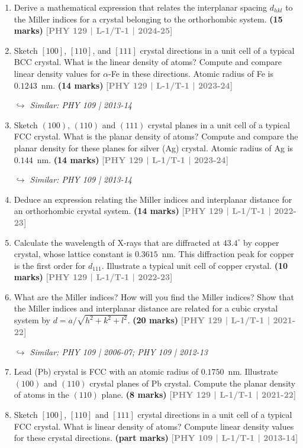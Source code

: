 \documentclass[12pt,a3paper]{article}
\newcommand{\yr}[1]{\hfill\textcolor{gray}{\small\textbf{[#1]}}}
\newcommand{\mk}[1]{\textcolor{orange!70!black}{\small\textbf{(#1 marks)}}}
\newcommand{\variant}[1]{\par\vspace{1pt}\textcolor{blue!50!black}%
  {\footnotesize\textit{$\hookrightarrow$ Similar: #1}}}
\begin{document}
\begin{enumerate}
\item Derive a mathematical expression that relates the interplanar spacing $d_{hkl}$ to the
Miller indices for a crystal belonging to the orthorhombic system.
\mk{15} \yr{PHY 129 | L-1/T-1 | 2024-25}


\item Sketch $[100]$, $[110]$, and $[111]$ crystal directions in a unit cell of a typical BCC crystal. What is the linear density of atoms? Compute and compare linear density values for $\alpha$-Fe in these directions. Atomic radius of Fe is $0.1243$~nm.
\mk{14} \yr{PHY 129 | L-1/T-1 | 2023-24}
\variant{PHY 109 | 2013-14}

\item Sketch $(100)$, $(110)$ and $(111)$ crystal planes in a unit cell of a typical FCC crystal. What is the planar density of atoms? Compute and compare the planar density for these planes for silver (Ag) crystal. Atomic radius of Ag is $0.144$~nm.
\mk{14} \yr{PHY 129 | L-1/T-1 | 2023-24}
\variant{PHY 109 | 2013-14}

\item Deduce an expression relating the Miller indices and interplanar distance for an orthorhombic crystal system.
\mk{14} \yr{PHY 129 | L-1/T-1 | 2022-23}

\item Calculate the wavelength of X-rays that are diffracted at $43.4^\circ$ by copper crystal, whose lattice constant is $0.3615$~nm. This diffraction peak for copper is the first order for $d_{111}$. Illustrate a typical unit cell of copper crystal.
\mk{10} \yr{PHY 129 | L-1/T-1 | 2022-23}

\item What are the Miller indices? How will you find the Miller indices? Show that the Miller indices and interplanar distance are related for a cubic crystal system by $d = a/\sqrt{h^2+k^2+l^2}$.
\mk{20} \yr{PHY 129 | L-1/T-1 | 2021-22}
\variant{PHY 109 | 2006-07; PHY 109 | 2012-13}

\item Lead (Pb) crystal is FCC with an atomic radius of $0.1750$~nm. Illustrate $(100)$ and $(110)$ crystal planes of Pb crystal. Compute the planar density of atoms in the $(110)$ plane.
\mk{8} \yr{PHY 129 | L-1/T-1 | 2021-22}

\item Sketch $[100]$, $[110]$ and $[111]$ crystal directions in a unit cell of a typical FCC crystal. What is linear density of atoms? Compute linear density values for these crystal directions.
\mk{part} \yr{PHY 109 | L-1/T-1 | 2013-14}


\end{enumerate}
\end{document}
